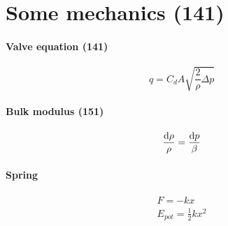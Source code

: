 \documentclass[a4paper, 12pt]{article}
\begin{document}
\section{Some mechanics (141)}
\paragraph{Valve equation (141)}
\begin{equation}
	q = C_d A \sqrt{\frac{2}{\rho} \Delta p}
\end{equation}

\paragraph{Bulk modulus (151)}
\begin{equation}
	\frac{\dif \rho}{\rho} = \frac{\dif p}{\beta}
\end{equation}

\paragraph{Spring}
\begin{gather}
	F = - k x \\
	E_{pot} = \frac{1}{2} k x^2
\end{gather}
\end{document}
